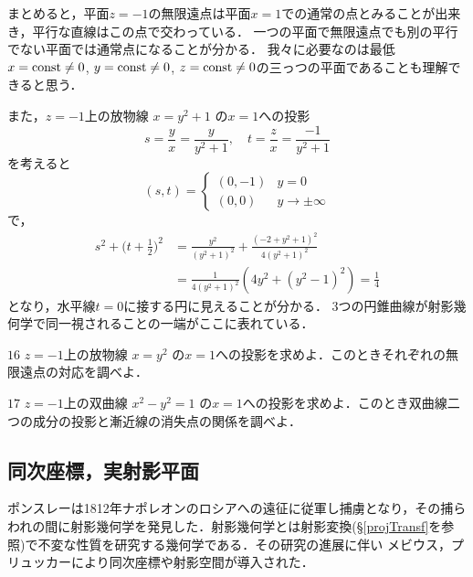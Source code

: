 まとめると，平面$z=-1$の無限遠点は平面$x=1$での通常の点とみることが出来き，平行な直線はこの点で交わっている．
一つの平面で無限遠点でも別の平行でない平面では通常点になることが分かる．
我々に必要なのは最低 $x=\operatorname{const}\neq 0$, $y=\operatorname{const}\neq 0$, $z=\operatorname{const}\neq 0$の三っつの平面であることも理解できると思う．
\emptyline

また，$z=-1$上の放物線
$
	x = y^2+1
$
の$x=1$への投影
\[
	s=\frac yx=\frac{y}{y^2+1},\quad
	t=\frac zx=\frac{-1}{y^2+1}
\]
を考えると
\[
	(s,t)
	=
	\begin{cases}
		(0,-1)& y=0\\
		(0,0)& y\to \pm \infty
	\end{cases}
\]
で，
\[
\begin{split}
	s^2 + \biggl(t+\frac12\biggr)^2
	&=\frac{y^2}{(y^2+1)^2} + \frac{(-2 +y^2+1)^2}{4(y^2+1)^2}\\
	&= \frac{1}{4(y^2+1)^2}(4y^2 + (y^2-1)^2)
	=\frac{1}{4}
\end{split}
\]
となり，水平線$t=0$に接する円に見えることが分かる．
3つの円錐曲線が射影幾何学で同一視されることの一端がここに表れている．


\begin{Quiz}$16$
$z=-1$上の放物線
$
	x = y^2
$
の$x=1$への投影を求めよ．このときそれぞれの無限遠点の対応を調べよ．
\end{Quiz}

\begin{Quiz}$17$
$z=-1$上の双曲線
$
	x^2- y^2=1
$
の$x=1$への投影を求めよ．このとき双曲線二つの成分の投影と漸近線の消失点の関係を調べよ．
\end{Quiz}


\subsection{同次座標，実射影平面}
ポンスレーは1812年ナポレオンのロシアへの遠征に従軍し捕虜となり，その捕らわれの間に射影幾何学を発見した．射影幾何学とは射影変換(\S \ref{projTransf}を参照)で不変な性質を研究する幾何学である．その研究の進展に伴い
メビウス，プリュッカーにより同次座標や射影空間が導入された．


